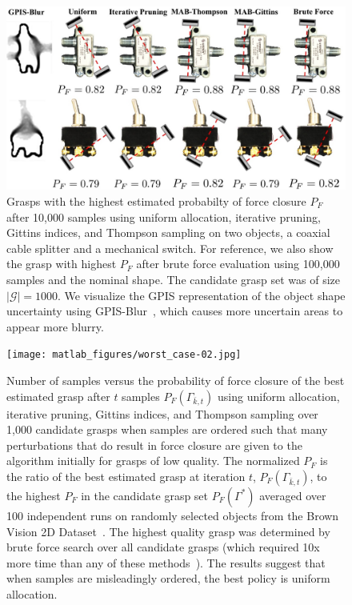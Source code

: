 \documentclass[10pt, conference]{ieeeconf}      %
\newcommand{\mG}{\mathcal{G}}
\begin{document}
\begin{figure}%
\label{fig:shape_examples}
    \centering
    \includegraphics[width=16.5cm]{figures/shapes.jpg}%
    \caption{Grasps with the highest estimated probabilty of force closure $P_F$ after 10,000 samples using uniform allocation, iterative pruning, Gittins indices, and Thompson sampling on two objects, a coaxial cable splitter and a mechanical switch. For reference, we also show the grasp with highest $P_F$ after brute force evaluation using 100,000 samples and the nominal shape. The candidate grasp set was of size $|\mG|=1000$. We visualize the GPIS representation of the object shape uncertainty using GPIS-Blur~\cite{mahler2015gp}, which causes more uncertain areas to appear more blurry.}%
    \label{fig:shape_samples}%
\end{figure}

\begin{figure}[ht!]
\centering
\texttt{[image: matlab\_figures/worst\_case-02.jpg]}
\caption{ \footnotesize 
	Number of samples versus the probability of force closure of the best estimated grasp after $t$ samples $P_F(\Gamma_{\bar{k}, t})$ using uniform allocation, iterative pruning, Gittins indices, and Thompson sampling over 1,000 candidate grasps when samples are ordered such that many perturbations that do result in force closure are given to the algorithm initially for grasps of low quality.
	The normalized $P_F$ is the ratio of the best estimated grasp at iteration $t$, $P_F(\Gamma_{\bar{k}, t})$, to the highest $P_F$ in the candidate grasp set $P_F(\Gamma^*)$ averaged over 100 independent runs on randomly selected objects from the Brown Vision 2D Dataset~\cite{brown}.
 	The highest quality grasp was determined by brute force search over all candidate grasps (which required 10x  more time than any of these methods~\cite{kehoe2012toward}).
 	The results suggest that when samples are misleadingly ordered, the best policy is uniform allocation.}
\vspace*{-10pt}
\label{fig:worst_case}
\end{figure}
\end{document}
